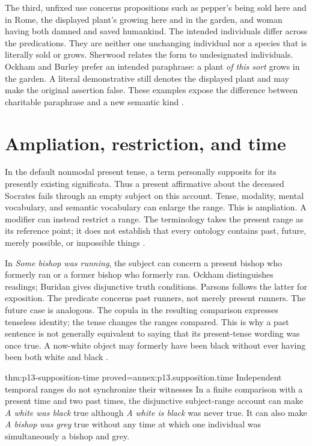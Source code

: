 The third, unfixed use concerns propositions such as pepper's being
sold here and in Rome, the displayed plant's growing here and in the
garden, and woman having both damned and saved humankind. The intended
individuals differ across the predications. They are neither one
unchanging individual nor a species that is literally sold or grows.
Sherwood relates the form to undesignated individuals. Ockham and
Burley prefer an intended paraphrase: a plant \emph{of this sort} grows
in the garden. A literal demonstrative still denotes the displayed
plant and may make the original assertion false. These examples expose
the difference between charitable paraphrase and a new semantic kind
\cite[pp.~201--202]{Parsons2007FordhamSupposition}.

\section{Ampliation, restriction, and time}
\label{sec:p13-supposition-ampliation}

In the default nonmodal present tense, a term personally supposits for
its presently existing significata. Thus a present affirmative about
the deceased Socrates fails through an empty subject on this account.
Tense, modality, mental vocabulary, and semantic vocabulary can enlarge
the range. This is ampliation. A modifier can instead restrict a range.
The terminology takes the present range as its reference point; it does
not establish that every ontology contains past, future, merely possible,
or impossible things
\cite[pp.~202--205]{Parsons2007FordhamSupposition}.

In \emph{Some bishop was running}, the subject can concern a present
bishop who formerly ran or a former bishop who formerly ran. Ockham
distinguishes readings; Buridan gives disjunctive truth conditions.
Parsons follows the latter for exposition. The predicate concerns past
runners, not merely present runners. The future case is analogous.
The copula in the resulting comparison expresses tenseless identity;
the tense changes the ranges compared. This is why a past sentence is
not generally equivalent to saying that its present-tense wording was
once true. A now-white object may formerly have been black without
ever having been both white and black
\cite[pp.~206--208]{Parsons2007FordhamSupposition}.

\begin{hbtheorem}{thm:p13-supposition-time}
 {proved=annex:p13.supposition.time}
 {Independent temporal ranges do not synchronize their witnesses}
In a finite comparison with a present time and two past times, the
disjunctive subject-range account can make \emph{A white was black}
true although \emph{A white is black} was never true. It can also make
\emph{A bishop was grey} true without any time at which one individual
was simultaneously a bishop and grey.
\end{hbtheorem}

